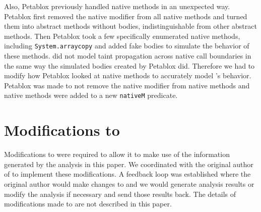 Also, Petablox previously handled native methods in an unexpected
way. Petablox first removed the native modifier from all native
methods and turned them into abstract methods without bodies,
indistinguishable from other abstract methods. Then Petablox took a
few specifically enumerated native methods, including
\texttt{System.arraycopy} and added fake bodies to simulate the
behavior of these methods. \phosphor{} did not model taint propagation
across native call boundaries in the same way the simulated bodies
created by Petablox did. Therefore we had to modify how Petablox
looked at native methods to accurately model \phosphor{}'s
behavior. Petablox was made to not remove the native modifier from
native methods and native methods were added to a new \texttt{nativeM}
predicate.
\section{Modifications to \phosphor{}}
Modifications to \phosphor{} were required to allow it to make use of
the information generated by the analysis in this paper. We
coordinated with the original author of \phosphor{} to implement these
modifications. A feedback loop was established where the original
author would make changes to \phosphor{} and we would generate
analysis results or modify the analysis if necessary and send those
results back. The details of modifications made to \phosphor{} are not
described in this paper.
